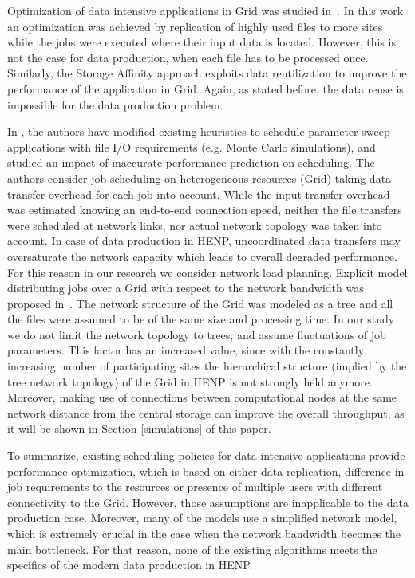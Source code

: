 \documentclass{svjour3}                     %
\begin{document}
Optimization of data intensive applications in Grid was studied
in~\cite{Globus_scheduler}. In this work an optimization was achieved by
replication of highly used files to more sites while the jobs were executed
where their input data is located. However, this is not the case for data
production, when each file has to be processed once. Similarly, the Storage Affinity  \cite{StorageAffinity} approach exploits data reutilization to improve the performance of the application in Grid. Again, as stated before, the data reuse is impossible for the data production problem.

In \cite{XSuffarage}, the authors have modified existing heuristics  to schedule parameter sweep applications with file I/O requirements (e.g. Monte Carlo simulations), and studied an impact of inaccurate performance prediction on scheduling. The authors consider job scheduling on heterogeneous resources (Grid) taking data transfer overhead for each job into account. While the input transfer overhead was estimated knowing an end-to-end connection speed, neither the file transfers were scheduled at network links, nor actual network topology was taken into account. In case of data production in HENP, uncoordinated data transfers may oversaturate the network capacity which leads to overall degraded performance. For this reason in our research we consider network load planning.
%
Explicit model distributing jobs over a Grid with respect to the network
bandwidth was proposed in~\cite{Trees}. The network structure of the Grid was
modeled as a tree and all the files were assumed to be of the same size and
processing time. In our study we do not limit the network topology to trees,
and assume fluctuations of job parameters. This factor has an increased value, since with the constantly increasing number of participating sites the hierarchical structure (implied by the tree network topology) of the Grid in HENP is not strongly held anymore. Moreover, making use of connections between computational nodes at the same network distance from the central storage can improve the overall throughput, as it will be shown in Section \ref{simulations} of this paper.

To summarize, existing scheduling policies for data intensive applications provide performance optimization, which is based on either data replication, difference in job requirements to the resources or presence of multiple users with different connectivity to the Grid. However, those assumptions are inapplicable to the data production case. Moreover, many of the models use a simplified network model, which is extremely crucial in the case when the network bandwidth becomes the main bottleneck. For that reason, none of the existing algorithms meets the specifics of the modern data production in HENP.
\end{document}
